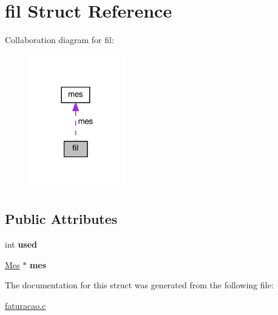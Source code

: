 \hypertarget{structfil}{}\section{fil Struct Reference}
\label{structfil}


Collaboration diagram for fil\+:
\nopagebreak
\begin{figure}[H]
\begin{center}
\leavevmode
\includegraphics[width=120pt]{structfil__coll__graph}
\end{center}
\end{figure}
\subsection*{Public Attributes}
\begin{DoxyCompactItemize}
\item 
\mbox{\label{structfil_a33ff794e38a053923179cf7bc1b1ac48}} 
int {\bfseries used}
\item 
\mbox{\label{structfil_a6837e994f9fa4c7c9db93dff06600b8b}} 
\hyperlink{structmes}{Mes} $\ast$ {\bfseries mes}
\end{DoxyCompactItemize}


The documentation for this struct was generated from the following file\+:\begin{DoxyCompactItemize}
\item 
\hyperlink{faturacao_8c}{faturacao.\+c}\end{DoxyCompactItemize}
